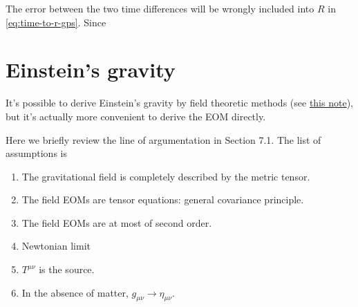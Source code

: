 \documentclass[hyperref, a4paper]{article}
\newcommand{\grnote}{\href{../relativity/relativistic.pdf}{this note}}
\begin{document}

The error between the two time differences will 
be wrongly included into $R$ in \eqref{eq:time-to-r-gps}. Since 

\section{Einstein's gravity}

It's possible to derive Einstein's gravity by field theoretic methods (see \grnote), 
but it's actually more convenient to derive the EOM directly. 

Here we briefly review the line of argumentation in Section 7.1. 
The list of assumptions is 
\begin{enumerate}
    \item The gravitational field is completely described by the metric tensor.
    \item The field EOMs are tensor equations: general covariance principle.
    \item The field EOMs are at most of second order.
    \item Newtonian limit
    \item $T^{\mu \nu}$ is the source.
    \item In the absence of matter, $g_{\mu \nu} \to \eta_{\mu \nu}$.
\end{enumerate}
\end{document}
